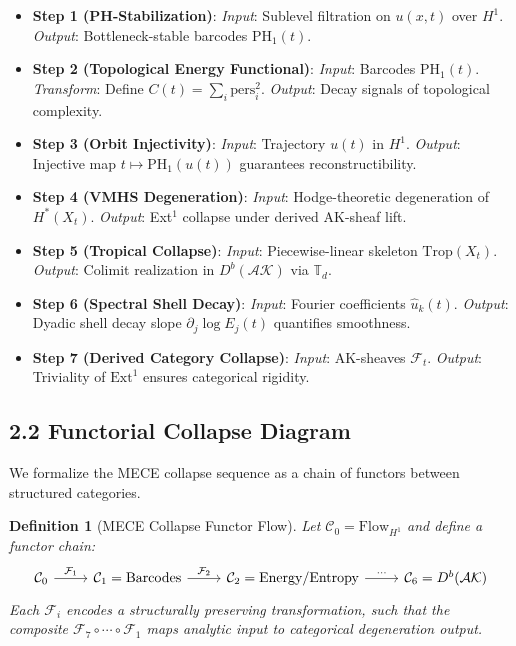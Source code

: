\documentclass[11pt]{article}
\newtheorem{definition}[theorem]{Definition}
\begin{document}
\begin{itemize}
  \item \textbf{Step 1 (PH-Stabilization)}:  
  \emph{Input}: Sublevel filtration on $u(x,t)$ over $H^1$.  
  \emph{Output}: Bottleneck-stable barcodes $\mathrm{PH}_1(t)$.

  \item \textbf{Step 2 (Topological Energy Functional)}:  
  \emph{Input}: Barcodes $\mathrm{PH}_1(t)$.  
  \emph{Transform}: Define $C(t) = \sum_i \text{pers}_i^2$.  
  \emph{Output}: Decay signals of topological complexity.

  \item \textbf{Step 3 (Orbit Injectivity)}:  
  \emph{Input}: Trajectory $u(t)$ in $H^1$.  
  \emph{Output}: Injective map $t \mapsto \mathrm{PH}_1(u(t))$ guarantees reconstructibility.

  \item \textbf{Step 4 (VMHS Degeneration)}:  
  \emph{Input}: Hodge-theoretic degeneration of $H^*(X_t)$.  
  \emph{Output}: Ext$^1$ collapse under derived AK-sheaf lift.

  \item \textbf{Step 5 (Tropical Collapse)}:  
  \emph{Input}: Piecewise-linear skeleton $\mathrm{Trop}(X_t)$.  
  \emph{Output}: Colimit realization in $D^b(\mathcal{AK})$ via $\mathbb{T}_d$.

  \item \textbf{Step 6 (Spectral Shell Decay)}:  
  \emph{Input}: Fourier coefficients $\hat{u}_k(t)$.  
  \emph{Output}: Dyadic shell decay slope $\partial_j \log E_j(t)$ quantifies smoothness.

  \item \textbf{Step 7 (Derived Category Collapse)}:  
  \emph{Input}: AK-sheaves $\mathcal{F}_t$.  
  \emph{Output}: Triviality of $\mathrm{Ext}^1$ ensures categorical rigidity.
\end{itemize}

\subsection*{2.2 Functorial Collapse Diagram}

We formalize the MECE collapse sequence as a chain of functors between structured categories.

\begin{definition}[MECE Collapse Functor Flow]
Let $\mathcal{C}_0 = \text{Flow}_{H^1}$ and define a functor chain:
\[
\begin{tikzcd}
\mathcal{C}_0 \arrow[r, "\mathcal{F}_1"] & \mathcal{C}_1 = \text{Barcodes} \arrow[r, "\mathcal{F}_2"] & \mathcal{C}_2 = \text{Energy/Entropy} \arrow[r, "\cdots"] & \mathcal{C}_6 = D^b(\mathcal{AK})
\end{tikzcd}
\]
Each $\mathcal{F}_i$ encodes a structurally preserving transformation, such that the composite $\mathcal{F}_7 \circ \cdots \circ \mathcal{F}_1$ maps analytic input to categorical degeneration output.
\end{definition}
\end{document}
